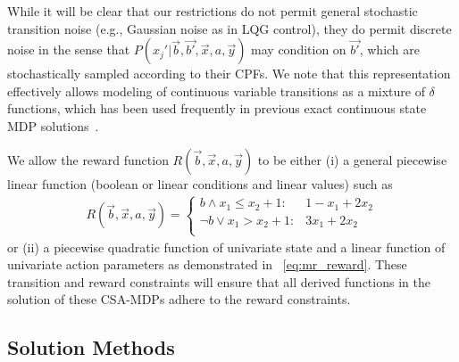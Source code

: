 While it will be clear
that our restrictions do not permit general stochastic transition
noise (e.g., Gaussian noise as in LQG control), they do permit
discrete noise in the sense that
$P(x_j'|\vec{b},\vec{b'},\vec{x},a,\vec{y})$ may condition on
$\vec{b'}$, which are stochastically sampled according to their CPFs.
We note that this representation effectively allows modeling of
continuous variable transitions as a mixture of $\delta$ functions,
which has been used frequently in previous exact continuous state MDP
solutions~\cite{feng04,hao09}.


We allow the reward function $R(\vec{b},\vec{x},a,\vec{y})$ to be either
(i) a general piecewise linear function (boolean or linear conditions
and linear values) such as
\begin{align}
R(\vec{b},\vec{x},a,\vec{y}) = \begin{cases}
b \land x_1 \leq x_2 + 1 : & 1 - x_1 + 2x_2 \\
\neg b \lor x_1 > x_2 + 1:     & 3x_1 + 2x_2 \\
\end{cases} \label{eq:linear_reward}
\end{align}
or (ii) a piecewise quadratic function of univariate state 
and a linear function of univariate action parameters 
as demonstrated in \MarsRover~\eqref{eq:mr_reward}.  
These transition and reward constraints will ensure that all derived
functions in the solution of these CSA-MDPs adhere to the reward 
constraints.




\subsection{Solution Methods}

